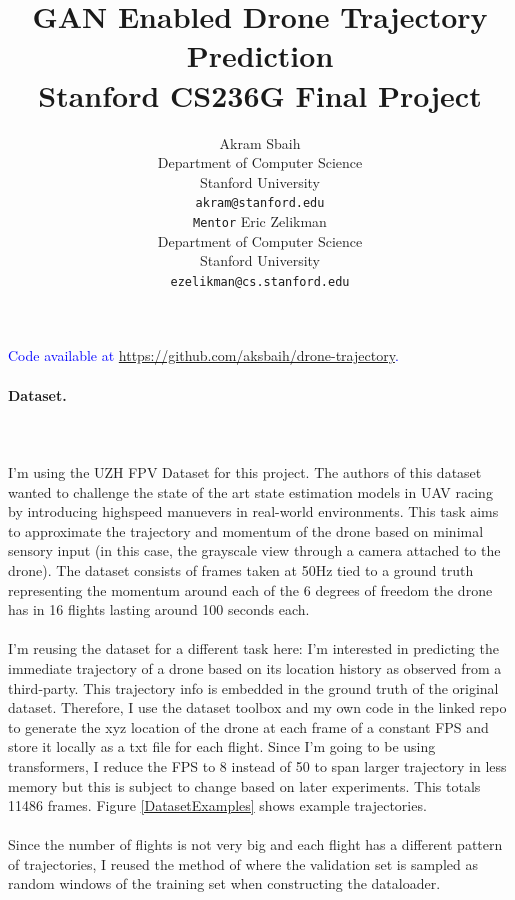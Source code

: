 \documentclass{article}
\title{
  GAN Enabled Drone Trajectory Prediction \\
  \vspace{1em}
  \small{\normalfont Stanford CS236G Final Project} 
}
\author{
  Akram Sbaih \\
  Department of Computer Science \\
  Stanford University \\
  \texttt{akram@stanford.edu} \\
     \And
   \texttt{Mentor} Eric Zelikman \\
   Department of Computer Science \\
   Stanford University \\
   \texttt{ezelikman@cs.stanford.edu} \\
}
\newcommand{\note}[1]{\textcolor{blue}{{#1}}}
\begin{document}
\maketitle




\note{Code available at \href{https://github.com/aksbaih/drone-trajectory}{https://github.com/aksbaih/drone-trajectory}.}

\paragraph{Dataset.}$ $
\\\\ I'm using the UZH FPV Dataset \cite{Delmerico19icra} for this project. The authors of this dataset wanted to challenge the state of the art state estimation models in UAV racing by introducing highspeed manuevers in real-world environments. This task aims to approximate the trajectory and momentum of the drone based on minimal sensory input (in this case, the grayscale view through a camera attached to the drone). The dataset consists of frames taken at 50Hz tied to a ground truth representing the momentum around each of the 6 degrees of freedom the drone has in 16 flights lasting around 100 seconds each. 
\\\\ I'm reusing the dataset for a different task here: I'm interested in predicting the immediate trajectory of a drone based on its location history as observed from a third-party. This trajectory info is embedded in the ground truth of the original dataset. Therefore, I use the dataset toolbox and my own code in the linked repo to generate the xyz location of the drone at each frame of a constant FPS and store it locally as a txt file for each flight.  Since I'm going to be using transformers, I reduce the FPS to 8 instead of 50 to span larger trajectory in less memory but this is subject to change based on later experiments.  This totals 11486 frames.  Figure \ref{DatasetExamples} shows example trajectories.
\\\\ Since the number of flights is not very big and each flight has a different pattern of trajectories, I reused the method of \cite{giuliari2020transformer} where the validation set is sampled as random windows of the training set when constructing the dataloader. 
\end{document}
